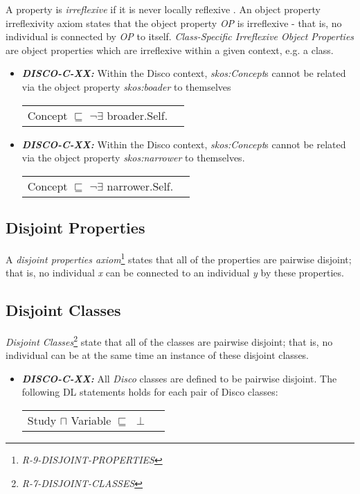 \documentclass{llncs}
\newenvironment{DL}{
  \vspace{0cm}
  \begin{tabular}{r l}

}{
  \end{tabular}
}
\begin{document}
A property is \emph{irreflexive} if it is never locally reflexive \cite{Kroetzsch2012}.
An object property irreflexivity axiom states that the object property \emph{OP} is irreflexive - that is, no individual is connected by \emph{OP} to itself.
\emph{Class-Specific Irreflexive Object Properties} are object properties which are irreflexive within a given context, e.g. a class. 

\begin{itemize}
  \item \textbf{{\em DISCO-C-XX:}}
Within the Disco context, {\em skos:Concept}s cannot be related via the object property {\em skos:boader} to themselves

\begin{DL}
Concept $\sqsubseteq$ $\neg$$\exists$ broader.Self. 
\end{DL}

	\item \textbf{{\em DISCO-C-XX:}}
Within the Disco context, {\em skos:Concept}s cannot be related via the object property {\em skos:narrower} to themselves. 

\begin{DL}
Concept $\sqsubseteq$ $\neg$$\exists$ narrower.Self. 
\end{DL}
\end{itemize}

\subsection{Disjoint Properties}

A \emph{disjoint properties axiom}\footnote{\emph{R-9-DISJOINT-PROPERTIES}} states that all of the properties are pairwise disjoint; 
that is, no individual \emph{x} can be connected to an individual \emph{y} by these properties. 

\subsection{Disjoint Classes}

{\em Disjoint Classes}\footnote{{\em R-7-DISJOINT-CLASSES}} state that all of the classes are pairwise disjoint; 
that is, no individual can be at the same time an instance of these disjoint classes.

\begin{itemize}
	\item \textbf{{\em DISCO-C-XX:}} 
All \emph{Disco} classes are defined to be pairwise disjoint.
The following DL statements holds for each pair of Disco classes:

\begin{DL}
Study $\sqcap$ Variable $\sqsubseteq$ $\perp$\\
\end{DL}
\end{itemize}
\end{document}

